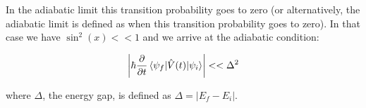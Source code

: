In the adiabatic limit this transition probability goes to zero (or alternatively, the adiabatic limit is defined as when this transition probability goes to zero).  In that case we have $\sin^2(x) << 1$ and we arrive at the adiabatic condition:

\begin{equation}
	\left| \hbar \frac{\partial}{\partial t} \mathinner{\langle{\psi_f | \hat{V}(t) | \psi_i}\rangle} \right| << \Delta^2
\end{equation}

where $\Delta$, the energy gap, is defined as $\Delta = |E_f - E_i|$.
